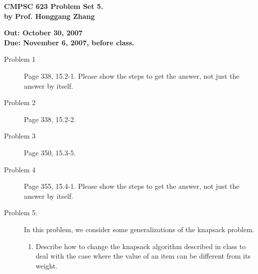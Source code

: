 \documentclass[11pt]{article}
\begin{document}

\begin{center}
{\bf CMPSC 623 Problem Set 5. } \\
{\bf by Prof. Honggang Zhang} \\
\end{center}
\begin{center}
{\bf Out: October 30, 2007} \\
{\bf Due: November 6, 2007, before class.} \\

\end{center}


\begin{description}


\item[Problem 1] Page 338, 15.2-1. Please show the steps to get the answer, not just the answer by itself.

\item[Problem 2] Page 338, 15.2-2.


\item[Problem 3] Page 350, 15.3-5.

\item[Problem 4] Page 355, 15.4-1. Please show the steps to get the answer, not just the answer by itself.


\item[Problem 5.]

In this problem, we consider some generalizations of the knapsack problem.

\begin{enumerate}
\item Describe how to change the knapsack algorithm described in class to deal with the case where
the value of an item can be different from its weight.


\begin{comment}
---------------------------
\noindent \textbf{Solution:}

If the value of an item can be different from its weight, our dynamic programming algorithm runs as
follows.

\[i\geq1 \textrm{  :  } knap(i,j)=\left\{\begin{array}{ll} max\{knap(i-1,j),knap(i-1,j-w_i)+v_i\} & w_i\leq j\\ knap(i-1,j) & w_i>j

\end{array}\right.\]


\end{comment}
\end{enumerate}
\end{description}
\end{document}
